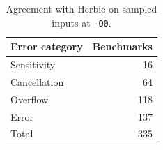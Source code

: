 \begin{table}
  \caption{Agreement with Herbie on sampled inputs at \texttt{-O0}.}
  \label{tab:herbie_agreements}
  \centering
  \begin{tabular}{lr}
    \toprule
    Error category & Benchmarks\\
    \midrule
    Sensitivity & 16\\
    Cancellation & 64\\
    Overflow & 118\\
    Error & 137\\
    \midrule
    Total & 335\\
  \bottomrule
\end{tabular}
\end{table}